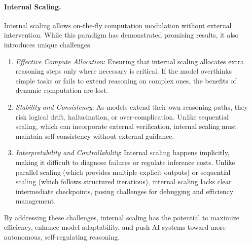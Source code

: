\paragraph{Internal Scaling.} Internal scaling allows on-the-fly computation modulation without external intervention. While this paradigm has demonstrated promising results, it also introduces unique challenges. 
\begin{enumerate}
    \item \textit{Effective Compute Allocation}: Ensuring that internal scaling allocates extra reasoning steps only where necessary is critical. If the model overthinks simple tasks or fails to extend reasoning on complex ones, the benefits of dynamic computation are lost.
    \item \textit{Stability and Consistency}: As models extend their own reasoning paths, they risk logical drift, hallucination, or over-complication. Unlike sequential scaling, which can incorporate external verification, internal scaling must maintain self-consistency without external guidance.
    \item \textit{Interpretability and Controllability}: Internal scaling happens implicitly, making it difficult to diagnose failures or regulate inference costs. Unlike parallel scaling (which provides multiple explicit outputs) or sequential scaling (which follows structured iterations), internal scaling lacks clear intermediate checkpoints, posing challenges for debugging and efficiency management.
\end{enumerate}

By addressing these challenges, internal scaling has the potential to maximize efficiency, enhance model adaptability, and push AI systems toward more autonomous, self-regulating reasoning.

